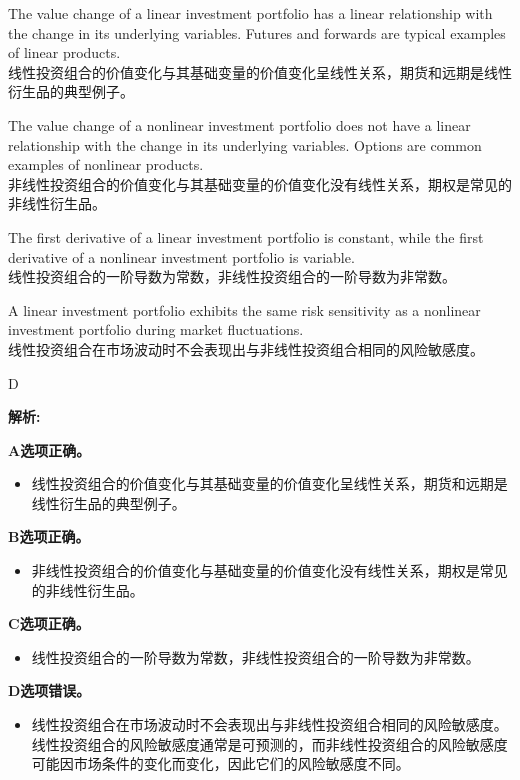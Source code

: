 \documentclass{article}
\newenvironment{explanation}
{\textbf{解析:}\par}
{\par}
\begin{document}
\begin{choices}
    \item The value change of a linear investment portfolio has a linear relationship with the change in its underlying variables. Futures and forwards are typical examples of linear products.\\
    线性投资组合的价值变化与其基础变量的价值变化呈线性关系，期货和远期是线性衍生品的典型例子。
    \item The value change of a nonlinear investment portfolio does not have a linear relationship with the change in its underlying variables. Options are common examples of nonlinear products.\\
    非线性投资组合的价值变化与其基础变量的价值变化没有线性关系，期权是常见的非线性衍生品。
    \item The first derivative of a linear investment portfolio is constant, while the first derivative of a nonlinear investment portfolio is variable.\\
    线性投资组合的一阶导数为常数，非线性投资组合的一阶导数为非常数。
    \item A linear investment portfolio exhibits the same risk sensitivity as a nonlinear investment portfolio during market fluctuations.\\
    线性投资组合在市场波动时不会表现出与非线性投资组合相同的风险敏感度。
\end{choices}

\begin{correctanswer}
    D
\end{correctanswer}

\begin{explanation}
    \textbf{A选项正确。}
    \begin{itemize}
        \item 线性投资组合的价值变化与其基础变量的价值变化呈线性关系，期货和远期是线性衍生品的典型例子。
    \end{itemize}

    \textbf{B选项正确。}
    \begin{itemize}
        \item 非线性投资组合的价值变化与基础变量的价值变化没有线性关系，期权是常见的非线性衍生品。
    \end{itemize}

    \textbf{C选项正确。}
    \begin{itemize}
        \item 线性投资组合的一阶导数为常数，非线性投资组合的一阶导数为非常数。
    \end{itemize}

    \textbf{D选项错误。}
    \begin{itemize}
        \item 线性投资组合在市场波动时不会表现出与非线性投资组合相同的风险敏感度。线性投资组合的风险敏感度通常是可预测的，而非线性投资组合的风险敏感度可能因市场条件的变化而变化，因此它们的风险敏感度不同。
    \end{itemize}
\end{explanation}
\end{document}

